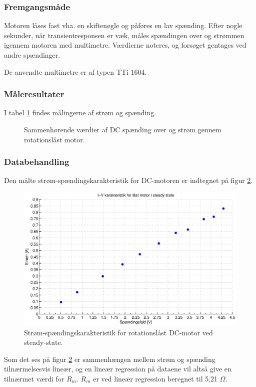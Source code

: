 \subsubsection{Fremgangsmåde}
Motoren låses fast vha. en skiftenøgle og påføres en lav spænding.
Efter nogle sekunder, når transientresponsen er væk,
måles spændingen over og strømmen igennem motoren med multimetre.
Værdierne noteres, og forsøget gentages ved andre spændinger.

De anvendte multimetre er af typen TTi 1604.
\subsubsection{Måleresultater}
I tabel \ref{tb:resistans} findes målingerne af strøm og spænding.
\begin{figure}[th!]
	\centering
	
	\captionsetup{type=table}
	\caption[Sammenhørende værdier af DC spænding og strøm]
			{Sammenhørende værdier af DC spænding over og strøm gennem rotationslåst motor.}
	\label{tb:resistans}
\end{figure}
\subsubsection{Databehandling}
Den målte strøm-spændingskarakteristik for DC-motoren er indtegnet på figur \ref{fig:resistans0}.
\begin{figure}[th!]
	\centering
	\includegraphics[width=1\textwidth]{./graphics/resistans1.eps}
	\caption[Strøm-spændingskarakteristik for rotationslåst DC-motor]{Strøm-spændingskarakteristik for rotationslåst DC-motor ved steady-state.}
	\label{fig:resistans0}
\end{figure}
Som det ses på figur \ref{fig:resistans0} er sammenhængen mellem strøm og spænding
tilnærmelsesvis lineær, og en lineær regression på dataene vil altså give en tilnærmet værdi for $R_m$.
$R_m$ er ved lineær regression beregnet til 5,21 $\Omega$.

